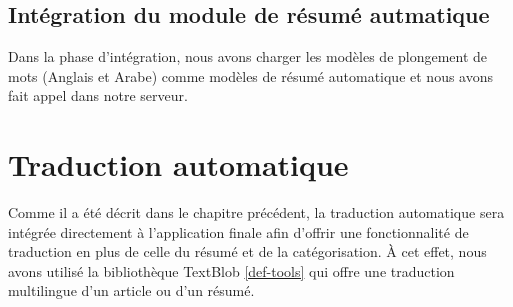 \subsection{Intégration du module de résumé autmatique}
Dans la phase d'intégration, nous avons charger les modèles de plongement de mots (Anglais et Arabe) comme modèles de résumé automatique et nous avons fait appel dans notre serveur.

\section{Traduction automatique}
Comme il a été décrit dans le chapitre précédent, la traduction automatique sera intégrée directement à l'application finale afin d'offrir une fonctionnalité de traduction en plus de celle du résumé et de la catégorisation. À cet effet, nous avons utilisé la bibliothèque TextBlob \autoref{def-tools} qui offre une traduction multilingue d'un article ou d'un résumé.


